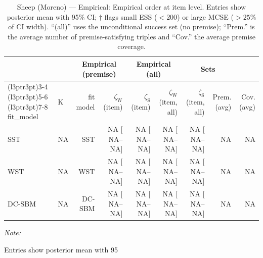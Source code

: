 \begin{table}
\centering
\caption{\label{tab:tab:sheep-moreno-empirical-emp-item}Sheep (Moreno) — Empirical: Empirical order at item level. Entries show posterior mean with 95\% CI; $\dagger$ flags small ESS ($<200$) or large MCSE ($>25\%$ of CI width). “(all)” uses the unconditional success set (no premise); “Prem.” is the average number of premise-satisfying triples and “Cov.” the average premise coverage.}
\centering
\begin{threeparttable}
\begin{tabular}[t]{llrrrrrrr}
\toprule
\multicolumn{2}{c}{ } & \multicolumn{2}{c}{Empirical (premise)} & \multicolumn{2}{c}{Empirical (all)} & \multicolumn{2}{c}{Sets} \\
\cmidrule(l{3pt}r{3pt}){3-4} \cmidrule(l{3pt}r{3pt}){5-6} \cmidrule(l{3pt}r{3pt}){7-8}
fit_model & K & fit model & $\zeta_{\mathrm{W}}$ (item) & $\zeta_{\mathrm{S}}$ (item) & $\zeta_{\mathrm{W}}$ (item, all) & $\zeta_{\mathrm{S}}$ (item, all) & Prem. (avg) & Cov. (avg)\\
\midrule
SST & NA & SST & NA [  NA--  NA] & NA [  NA--  NA] & NA [  NA--  NA] & NA [  NA--  NA] & NA & NA\\
WST & NA & WST & NA [  NA--  NA] & NA [  NA--  NA] & NA [  NA--  NA] & NA [  NA--  NA] & NA & NA\\
DC-SBM & NA & DC-SBM & NA [  NA--  NA] & NA [  NA--  NA] & NA [  NA--  NA] & NA [  NA--  NA] & NA & NA\\
\bottomrule
\end{tabular}
\begin{tablenotes}
\item \textit{Note: } 
\item Entries show posterior mean with 95%
\end{tablenotes}
\end{threeparttable}
\end{table}